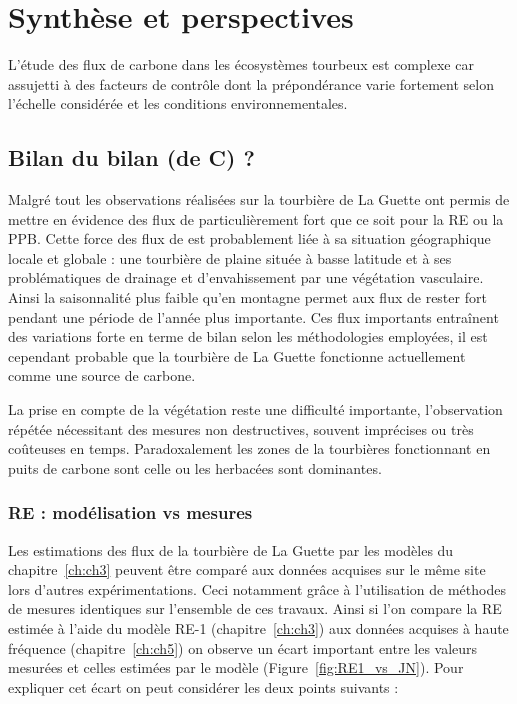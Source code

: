 \chapter*{Synthèse et perspectives}
\newpage

L'étude des flux de carbone dans les écosystèmes tourbeux est complexe car assujetti à des facteurs de contrôle dont la prépondérance varie fortement selon l'échelle considérée et les conditions environnementales.

\section{Bilan du bilan (de C) ?}

Malgré tout les observations réalisées sur la tourbière de La Guette ont permis de mettre en évidence des flux de \coo particulièrement fort que ce soit pour la RE ou la PPB.
Cette force des flux de \coo est probablement liée à sa situation géographique locale et globale : une tourbière de plaine située à basse latitude et à ses problématiques de drainage et d'envahissement par une végétation vasculaire.
Ainsi la saisonnalité plus faible qu'en montagne permet aux flux de rester fort pendant une période de l'année plus importante.
Ces flux importants entraînent des variations forte en terme de bilan selon les méthodologies employées, il est cependant probable que la tourbière de La Guette fonctionne actuellement comme une source de carbone.


La prise en compte de la végétation reste une difficulté importante, l'observation répétée nécessitant des mesures non destructives, souvent imprécises ou très coûteuses en temps.
Paradoxalement les zones de la tourbières fonctionnant en puits de carbone sont celle ou les herbacées sont dominantes.

\subsection{RE : modélisation vs mesures}

Les estimations des flux de la tourbière de La Guette par les modèles du chapitre~\ref{ch:ch3} peuvent être comparé aux données acquises sur le même site lors d'autres expérimentations.
Ceci notamment grâce à l'utilisation de méthodes de mesures identiques sur l'ensemble de ces travaux.
Ainsi si l'on compare la RE estimée à l'aide du modèle RE-1 (chapitre~\ref{ch:ch3}) aux données acquises à haute fréquence (chapitre~\ref{ch:ch5}) on observe un écart important entre les valeurs mesurées et celles estimées par le modèle (Figure~\ref{fig:RE1_vs_JN}).
Pour expliquer cet écart on peut considérer les deux points suivants : 

